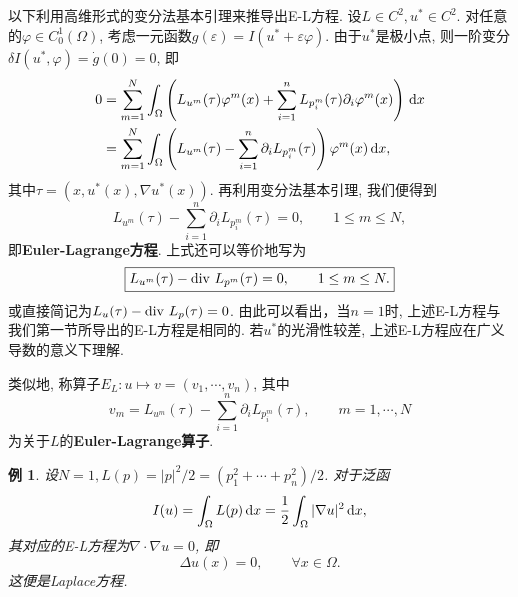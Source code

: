 \documentclass[12pt,a4paper]{article}
\newtheorem{example}[theorem]{例}
\begin{document}
以下利用高维形式的变分法基本引理来推导出E-L方程. 设$L \in C^2, u^* \in C^2$.
对任意的$\varphi \in C_0^1(\Omega)$, 考虑一元函数$g(\varepsilon) = I(u^* + \varepsilon\varphi)$.
由于$u^*$是极小点, 则一阶变分$\delta I(u^*, \varphi) = \dot g(0) = 0$, 即 
\begin{align*}
    0 &= \sum_{m = 1}^N\int_{\Omega}\left(L_{u^m}(\tau)\varphi^m(x) + \sum_{i = 1}^nL_{p^m_i}(\tau)\partial_i\varphi^m(x)\right)\,{\rm d}x \\  
    &= \sum_{m = 1}^N\int_{\Omega}\left(L_{u^m}(\tau) - \sum_{i = 1}^n\partial_iL_{p^m_i}(\tau)\right)\varphi^m(x) \,{\rm d}x,
\end{align*}
其中$\tau = (x, u^*(x), \nabla u^*(x))$. 再利用变分法基本引理, 我们便得到
\begin{equation*}
    \boxed{L_{u^m}(\tau) - \sum_{i = 1}^n\partial_iL_{p^m_i}(\tau) =0, \qquad 1 \leq m \leq N,}
\end{equation*}
即\textbf{Euler-Lagrange方程}. 上式还可以等价地写为 
\begin{equation*}
    \boxed{L_{u^m}(\tau) - {\rm div}\ L_{p^m}(\tau) = 0, \qquad 1 \leq m \leq N.}
\end{equation*}
或直接简记为$L_u(\tau) - {\rm div}\ L_p(\tau) = 0$. 由此可以看出，当$n = 1$时, 上述E-L方程与我们第一节所导出的E-L方程是相同的.
若$u^*$的光滑性较差, 上述E-L方程应在广义导数的意义下理解.

类似地, 称算子$E_L\colon u \mapsto v = (v_1, \cdots, v_n)$, 其中 
\begin{equation*}
    \boxed{v_m  = L_{u^m}(\tau) - \sum_{i = 1}^n\partial_iL_{p^m_i}(\tau), \qquad m = 1, \cdots, N}
\end{equation*}
为关于$L$的\textbf{Euler-Lagrange算子}.

\begin{example}
    设$N = 1, L(p) = |p|^2/2 = (p_1^2 + \cdots + p_n^2)/2$. 对于泛函 
    \begin{equation*}
        I(u) = \int_{\Omega}L(p) \,{\rm d}x = \frac{1}{2}\int_{\Omega}|\nabla u|^2 \,{\rm d}x,
    \end{equation*}
    其对应的E-L方程为$\nabla \cdot \nabla u = 0$, 即 
    \begin{equation*}
        \Delta u(x) = 0, \qquad \forall x \in \Omega.
    \end{equation*}
    这便是Laplace方程.
\end{example}
\end{document}
